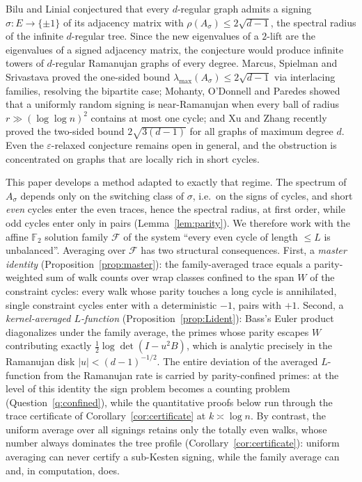 \documentclass[11pt]{article}
\theoremstyle{remark}
\begin{document}
Bilu and Linial \cite{bilulinial06} conjectured that every $d$-regular
graph admits a signing $\sigma\colon E\to\{\pm1\}$ of its adjacency
matrix with $\rho(A_\sigma)\le2\sqrt{d-1}$, the spectral radius of the
infinite $d$-regular tree. Since the new eigenvalues of a $2$-lift are
the eigenvalues of a signed adjacency matrix, the conjecture would
produce infinite towers of $d$-regular Ramanujan graphs of every
degree. Marcus, Spielman and Srivastava \cite{mss15} proved the
one-sided bound $\lambda_{\max}(A_\sigma)\le2\sqrt{d-1}$ via
interlacing families, resolving the bipartite case; Mohanty, O'Donnell
and Paredes \cite{mop20} showed that a uniformly random signing is
near-Ramanujan when every ball of radius $r\gg(\log\log n)^2$ contains
at most one cycle; and Xu and Zhang \cite{xuzhang26} recently proved
the two-sided bound $2\sqrt{3(d-1)}$ for all graphs of maximum degree
$d$. Even the $\varepsilon$-relaxed conjecture remains open in
general, and the obstruction is concentrated on graphs that are
locally rich in short cycles.

This paper develops a method adapted to exactly that regime. The
spectrum of $A_\sigma$ depends only on the switching class of
$\sigma$, i.e.\ on the signs of cycles, and short \emph{even} cycles
enter the even traces, hence the spectral radius, at first
order, while odd cycles enter only in pairs
(Lemma~\ref{lem:parity}). We therefore work with the affine
$\mathbb F_2$ solution family $\mathcal F$ of the system ``every even
cycle of length $\le L$ is unbalanced''. Averaging over $\mathcal F$
has two structural consequences. First, a \emph{master identity}
(Proposition~\ref{prop:master}): the family-averaged trace equals a
parity-weighted sum of walk counts over wrap classes confined to the
span $W$ of the constraint cycles: every walk whose parity touches
a long cycle is annihilated, single constraint cycles enter with a
deterministic $-1$, pairs with $+1$. Second, a \emph{kernel-averaged
$L$-function} (Proposition~\ref{prop:Lident}): Bass's Euler product
diagonalizes under the family average, the primes whose parity escapes
$W$ contributing exactly $\tfrac12\log\det(I-u^2B)$, which is analytic
precisely in the Ramanujan disk $|u|<(d-1)^{-1/2}$. The entire
deviation of the averaged $L$-function from the Ramanujan rate is
carried by parity-confined primes: at the level of this identity the
sign problem becomes a counting problem (Question~\ref{q:confined}),
while the quantitative proofs below run through the trace certificate
of Corollary~\ref{cor:certificate} at $k\asymp\log n$. By contrast, the
uniform average over all signings retains only the totally even
walks, whose number always dominates the tree profile
(Corollary~\ref{cor:certificate}): uniform averaging can never certify
a sub-Kesten signing, while the family average can and, in
computation, does.
\end{document}
